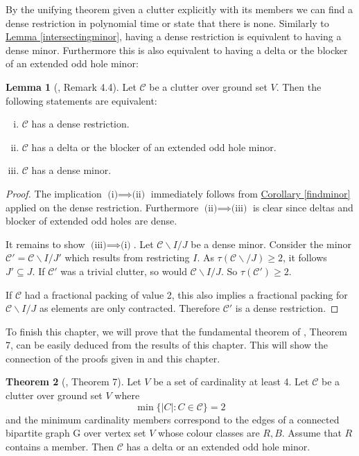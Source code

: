 \documentclass[a4paper, 12pt]{scrbook}
\theoremstyle{definition}
\newtheorem{theorem}{Theorem}[chapter]
\newtheorem{lemma}[theorem]{Lemma}
\begin{document}
   By the unifying theorem given a clutter explicitly with its members we can find a dense restriction in polynomial time or state that there is none. Similarly to \hyperref[intersectingminor]{Lemma \ref*{intersectingminor}}, having a dense restriction is equivalent to having a dense minor. Furthermore this is also equivalent to having a delta or the blocker of an extended odd hole minor:
   \begin{lemma}[\cite{restrictions}, Remark 4.4]
       Let $\mathcal{C}$ be a clutter over ground set $V$. Then the following statements are equivalent:
       \leavevmode
       \begin{enumerate}[(i)]
           \item $\mathcal{C}$ has a dense restriction.
           \item $\mathcal{C}$ has a delta or the blocker of an extended odd hole minor.
           \item $\mathcal{C}$ has a dense minor.
       \end{enumerate}
   \end{lemma}

   \begin{proof}
       The implication $\text{(i)} \implies \text{(ii)}$ immediately follows from \hyperref[findminor]{Corollary \ref*{findminor}} applied on the dense restriction. Furthermore $\text{(ii)} \implies \text{(iii)}$ is clear since deltas and blocker of extended odd holes are dense.

       It remains to show $\text{(iii)} \implies \text{(i)}$. Let $\mathcal{C} \backslash I /J$ be a dense minor. Consider the minor $\mathcal{C'}=\mathcal{C}\backslash I/J'$ which results from restricting $I$. As $\tau(\mathcal{C}\backslash /J)\geq 2$, it follows $J' \subseteq J$. If $\mathcal{C'}$ was a trivial clutter, so would $\mathcal{C} \backslash I/J$. So $\tau(\mathcal{C'})\geq 2$.

       If $\mathcal{C}$ had a fractional packing of value 2, this also implies a fractional packing for $\mathcal{C}\backslash I/J$ as elements are only contracted. Therefore $\mathcal{C'}$ is a dense restriction.
   \end{proof}

   To finish this chapter, we will prove that the fundamental theorem of \cite{deltas}, Theorem 7, can be easily deduced from the results of this chapter. This will show the connection of the proofs given in \cite{deltas} and this chapter.

   \begin{theorem}[\cite{deltas}, Theorem 7]
       Let $V$ be a set of cardinality at least 4. Let $\mathcal{C}$ be a clutter over ground set $V$ where
       \[
           \min\{|C|: C \in \mathcal{C}\} = 2
           \]
           and the minimum cardinality members correspond to the edges of a connected bipartite graph G over vertex set $V$ whose colour classes are $R,B$. Assume that $R$ contains a member. Then $\mathcal{C}$ has a delta or an extended odd hole minor.
   \end{theorem}
\end{document}
